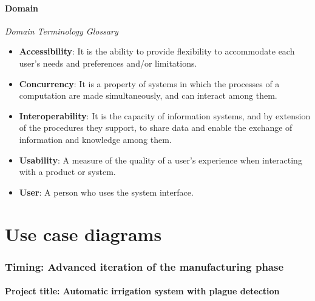 \documentclass[11pt,a4paper]{article}
\begin{document}

\subsection{Domain}
\textit{Domain Terminology Glossary}\\
\begin{itemize}
\item \textbf{Accessibility}: It is the ability to provide flexibility to accommodate each user's needs and preferences and/or limitations.
\item \textbf{Concurrency}: It is a property of systems in which the processes of a computation are made simultaneously, and can interact among them.
\item \textbf{Interoperability}: It is the capacity of information systems, and by extension of the procedures they support, to share data and enable the exchange of information and knowledge among them.
\item \textbf{Usability}: A measure of the quality of a user's experience when interacting with a product or system.
\item \textbf{User}: A person who uses the system interface.
\end{itemize}

\part{Use case diagrams}
\section{Timing: Advanced iteration of the manufacturing phase}
\subsection*{Project title: Automatic irrigation system with plague detection}
\end{document}
